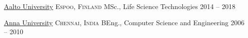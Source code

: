 
\headedsection
{\href{http://www.aalto.fi/}{Aalto University}}
  {\textsc{Espoo, Finland}} {%
  \headedsubsection
    {MSc., Life Science Technologies}
    {2014 -- 2018}
    {}
}

\headedsection
  {{\href{https://www.annauniv.edu/}{Anna University}}}
  {\textsc{Chennai, India}} {%
  \headedsubsection
    {BEng., Computer Science and Engineering}
    {2006 -- 2010}
    {}
}